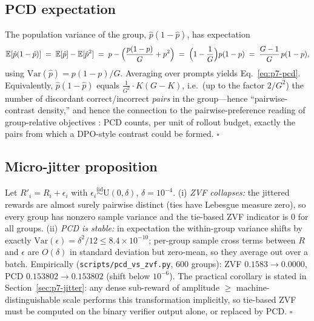 \documentclass{article}
\providecommand{\eps}{\ensuremath{\epsilon}}
\newcommand{\E}{\mathbb{E}}
\begin{document}
\subsection{PCD expectation}
\label{sec:p7-appendix-pcd}
The population variance of the group, $\hat p(1-\hat p)$, has expectation
\begin{equation}
  \E[\hat p(1-\hat p)]
  \;=\; \E[\hat p] - \E[\hat p^2]
  \;=\; p - \Bigl(\frac{p(1-p)}{G} + p^2\Bigr)
  \;=\; \Bigl(1 - \frac{1}{G}\Bigr) p (1-p)
  \;=\; \frac{G-1}{G}\, p(1-p),
\end{equation}
using $\mathrm{Var}(\hat p) = p(1-p)/G$. Averaging over prompts yields
Eq.~\eqref{eq:p7-pcd}. Equivalently, $\hat p(1-\hat p)$ equals
$\frac{1}{G^2} \cdot K(G-K)$, i.e.\ (up to the factor $2/G^2$) the number of
discordant correct/incorrect \emph{pairs} in the group---hence
``pairwise-contrast density,'' and hence the connection to the
pairwise-preference reading of group-relative objectives
\citep{wu2025grpo_dpo, rafailov2024direct}: PCD counts, per unit of rollout
budget, exactly the pairs from which a DPO-style contrast could be formed.
\hfill$\square$

\subsection{Micro-jitter proposition}
\label{sec:p7-appendix-jitter}
Let $R'_i = R_i + \eps_i$ with $\eps_i \stackrel{\text{iid}}{\sim}
\mathrm{U}(0, \delta)$, $\delta = 10^{-4}$. (i) \emph{ZVF collapses:} the
jittered rewards are almost surely pairwise distinct (ties have Lebesgue
measure zero), so every group has nonzero sample variance and the tie-based
ZVF indicator is $0$ for all groups. (ii) \emph{PCD is stable:} in
expectation the within-group variance shifts by exactly
$\mathrm{Var}(\eps) = \delta^2/12 \leq 8.4 \times 10^{-10}$; per-group
sample cross terms between $R$ and $\eps$ are $O(\delta)$ in standard
deviation but zero-mean, so they average out over a batch. Empirically
(\texttt{scripts/pcd\_vs\_zvf.py}, $600$ groups): ZVF $0.1583 \to 0.0000$,
PCD $0.153802 \to 0.153802$ (shift below $10^{-6}$). The practical
corollary is stated in Section~\ref{sec:p7-jitter}: any dense sub-reward of
amplitude $\geq$ machine-distinguishable scale performs this transformation
implicitly, so tie-based ZVF must be computed on the binary verifier output
alone, or replaced by PCD. \hfill$\square$
\end{document}

